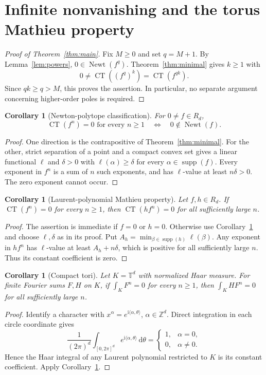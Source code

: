 \documentclass[11pt]{article}
\numberwithin{equation}{section}
\newtheorem{corollary}[theorem]{Corollary}
\theoremstyle{definition}
\theoremstyle{remark}
\newcommand{\Z}{\mathbb Z}
\newcommand{\T}{\mathbb T}
\newcommand{\CT}{\operatorname{CT}}
\newcommand{\Newt}{\operatorname{Newt}}
\newcommand{\supp}{\operatorname{supp}}
\newcommand{\dd}{\mathrm d}
\newcommand{\ii}{\mathrm i}
\newcommand{\pair}[2]{\langle #1,#2\rangle}
\begin{document}
\section{Infinite nonvanishing and the torus Mathieu property}\label{sec:corollaries}
\begin{proof}[Proof of Theorem~\ref{thm:main}]
Fix $M\ge0$ and set $q=M+1$. By Lemma~\ref{lem:powers},
$0\in\Newt(f^q)$. Theorem~\ref{thm:minimal} gives $k\ge1$ with
\[
 0\ne\CT((f^q)^k)=\CT(f^{qk}).
\]
Since $qk\ge q>M$, this proves the assertion. In particular, no separate
argument concerning higher-order poles is required.
\end{proof}

\begin{corollary}[Newton-polytope classification]\label{cor:classification}
For $0\ne f\in R_d$,
\[
 \CT(f^n)=0\text{ for every }n\ge1
 \quad\Longleftrightarrow\quad
 0\notin\Newt(f).
\]
\end{corollary}
\begin{proof}
One direction is the contrapositive of Theorem~\ref{thm:minimal}.
For the other, strict separation of a point and a compact convex set
gives a linear functional $\ell$ and $\delta>0$ with
$\ell(\alpha)\ge\delta$ for every $\alpha\in\supp(f)$. Every exponent
in $f^n$ is a sum of $n$ such exponents, and has $\ell$-value at least
$n\delta>0$. The zero exponent cannot occur.
\end{proof}

\begin{corollary}[Laurent-polynomial Mathieu property]\label{cor:mathieu}
Let $f,h\in R_d$. If $\CT(f^n)=0$ for every $n\ge1$, then
$\CT(hf^n)=0$ for all sufficiently large $n$.
\end{corollary}
\begin{proof}
The assertion is immediate if $f=0$ or $h=0$. Otherwise use
Corollary~\ref{cor:classification} and choose $\ell,\delta$ as in its
proof. Put $A_h=\min_{\beta\in\supp(h)}\ell(\beta)$. Any exponent in
$hf^n$ has $\ell$-value at least $A_h+n\delta$, which is positive for
all sufficiently large $n$. Thus its constant coefficient is zero.
\end{proof}

\begin{corollary}[Compact tori]\label{cor:torus}
Let $K=\T^d$ with normalized Haar measure. For finite Fourier sums
$F,H$ on $K$, if $\int_K F^n=0$ for every $n\ge1$, then
$\int_K HF^n=0$ for all sufficiently large $n$.
\end{corollary}
\begin{proof}
Identify a character with $x^\alpha=e^{\ii\pair{\alpha}{\theta}}$, $\alpha\in\Z^d$.
Direct integration in each circle coordinate gives
\[
 \frac1{(2\pi)^d}\int_{[0,2\pi]^d}
 e^{\ii\pair{\alpha}{\theta}}\,\dd\theta
 =\begin{cases}1,&\alpha=0,\\0,&\alpha\ne0.\end{cases}
\]
Hence the Haar integral of any Laurent polynomial restricted to $K$
is its constant coefficient. Apply Corollary~\ref{cor:mathieu}.
\end{proof}
\end{document}
